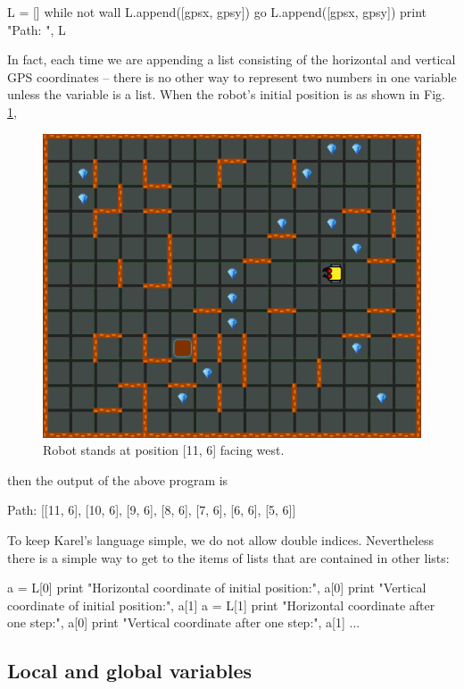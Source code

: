 \begin{bluecode}
L = []
while not wall
    L.append([gpsx, gpsy])
    go
L.append([gpsx, gpsy])
print "Path: ", L
\end{bluecode}
In fact, each time we are appending a list consisting of the horizontal and 
vertical GPS coordinates -- there is no other way to represent two numbers 
in one variable unless the variable is a list. When the robot's initial position 
is as shown in Fig. \ref{fig:list-1},

\begin{figure}[!ht]
\begin{center}
\includegraphics[height=0.4\textwidth]{imgk/lists-1.png}
\vspace{-0mm}
\caption{Robot stands at position [11, 6] facing west.}
\label{fig:list-1}
\end{center}
\end{figure}

\noindent
then the output of the above program is

\begin{greencode}
Path: [[11, 6], [10, 6], [9, 6], [8, 6], [7, 6], [6, 6], [5, 6]]
\end{greencode}
To keep Karel's language simple, we do not allow double indices. Nevertheless
there is a simple way to get to the items of lists that are contained in other lists:

\begin{bluecode}
a = L[0]
print "Horizontal coordinate of initial position:", a[0]
print "Vertical coordinate of initial position:", a[1]
a = L[1]
print "Horizontal coordinate after one step:", a[0]
print "Vertical coordinate after one step:", a[1]
...
\end{bluecode}

\subsection{Local and global variables}\label{subsec:karellocvar}

